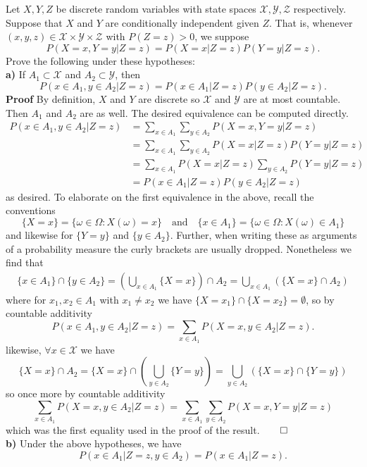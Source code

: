 \documentclass[11pt, letterpaper]{article}
\newcommand{\mc}[1]{\mathcal{#1}}
\begin{document}
     Let $X,Y,Z$ be discrete random variables with state spaces $\mc{X},\mc{Y},\mc{Z}$ respectively. Suppose that $X$ and $Y$ are
    conditionally independent given $Z$. That is, whenever $(x,y,z)\in\mc{X}\times\mc{Y}\times\mc{Z}$ with $P(Z=z)>0$, we suppose
    \[P(X=x,Y=y|Z=z)=P(X=x|Z=z)P(Y=y|Z=z).\]
    Prove the following under these hypotheses:\\[10pt]
    {\bf a)} If $A_1\subset\mc{X}$ and $A_2\subset\mc{Y}$, then
    \[P(x\in A_1,y\in A_2|Z=z)=P(x\in A_1|Z=z)P(y\in A_2|Z=z).\]
    {\bf Proof} By definition, $X$ and $Y$ are discrete so $\mc{X}$ and $\mc{Y}$ are at most countable. Then $A_1$ and $A_2$ are as well. The desired equivalence can be computed directly.
    \begin{align*}
        P(x\in A_1,y\in A_2|Z=z)&=\sum_{x\in A_1}\sum_{y\in A_2}P(X=x,Y=y|Z=z)\tag{countable additivity}\\
        &=\sum_{x\in A_1}\sum_{y\in A_2}P(X=x|Z=z)P(Y=y|Z=z)\tag{conditional independence}\\
        &=\sum_{x\in A_1}P(X=x|Z=z)\sum_{y\in A_2}P(Y=y|Z=z)\\
        &=P(x\in A_1|Z=z)P(y\in A_2|Z=z)
    \end{align*} 
    as desired. To elaborate on the first equivalence in the above, recall the conventions
    \[\{X=x\}=\{\omega\in\Omega:X(\omega)=x\}\quad\text{and}\quad\{x\in A_1\}=\{\omega\in\Omega:X(\omega)\in A_1\}\]
    and likewise for $\{Y=y\}$ and $\{y\in A_2\}$. Further, when writing these as arguments of a probability measure the curly brackets are usually dropped. Nonetheless we find that
    \begin{align*}
        \{x\in A_1\}\cap \{y\in A_2\}=\left(\bigcup_{x\in A_1}\{X=x\}\right)\cap A_2=\bigcup_{x\in A_1}(\{X=x\}\cap A_2)
    \end{align*}
    where for $x_1,x_2\in A_1$ with $x_1\neq x_2$ we have $\{X=x_1\}\cap\{X=x_2\}=\emptyset$, so by countable additivity
    \[P(x\in A_1, y\in A_2|Z=z)=\sum_{x\in A_1}P(X=x,y\in A_2|Z=z).\]
    likewise, $\forall x\in \mc{X}$ we have
    \[\{X=x\}\cap A_2=\{X=x\}\cap\left(\bigcup_{y\in A_2}\{Y=y\}\right)=\bigcup_{y\in A_2}(\{X=x\}\cap\{Y=y\})\]
    so once more by countable additivity
    \[\sum_{x\in A_1}P(X=x,y\in A_2|Z=z)=\sum_{x\in A_1}\sum_{y\in A_2}P(X=x,Y=y|Z=z)\]
    which was the first equality used in the proof of the result.\hfill{$\qed$}\\[10pt]
    {\bf b)} Under the above hypotheses, we have
    \[P(x\in A_1|Z=z,y\in A_2)=P(x\in A_1|Z=z).\]
\end{document}
